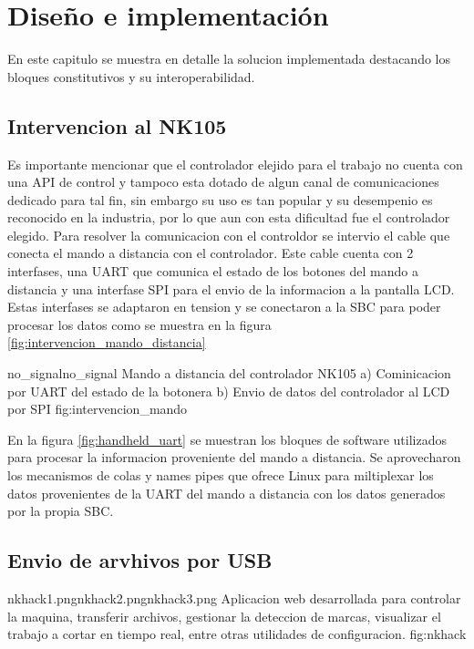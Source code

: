 \chapter{Diseño e implementación} %

\label{Chapter3} 

En este capitulo se muestra en detalle la solucion implementada destacando los bloques constitutivos y su interoperabilidad.


\section{Intervencion al NK105}

   Es importante mencionar que el controlador elejido para el trabajo no cuenta con una API de control y tampoco esta dotado de algun canal de comunicaciones dedicado para tal fin, sin embargo su uso es tan popular y su desempenio es reconocido en la industria, por lo que aun con esta dificultad fue el controlador elegido.
   Para resolver la comunicacion con el controldor se intervio el cable que conecta el mando a distancia con el controlador.
   Este cable cuenta con 2 interfases, una UART que comunica el estado de los botones del mando a distancia y una interfase SPI para el envio de la informacion a la pantalla LCD.
Estas interfases se adaptaron en tension y se conectaron a la SBC para poder procesar los datos como se muestra en la figura \ref{fig:intervencion_mando_distancia}

         {no_signal}{no_signal}
         {Mando a distancia del controlador NK105 a) Cominicacion por UART del estado de la botonera b) Envio de datos del controlador al LCD por SPI}
         {fig:intervencion_mando}

En la figura \ref{fig:handheld_uart} se muestran los bloques de software utilizados para procesar la informacion proveniente del mando a distancia.
   Se aprovecharon los mecanismos de colas y names pipes que ofrece Linux para miltiplexar los datos provenientes de la UART del mando a distancia con los datos generados por la propia SBC.


\section{Envio de arvhivos por USB}




            {nkhack1.png}{nkhack2.png}{nkhack3.png}
            {Aplicacion web desarrollada para controlar la maquina, transferir archivos, gestionar la deteccion de marcas, visualizar el trabajo a cortar en tiempo real, entre otras utilidades de configuracion.}
            {fig:nkhack}
